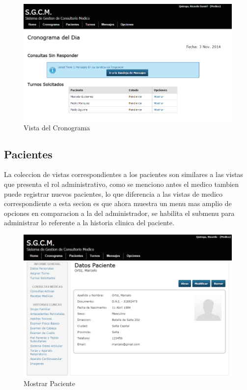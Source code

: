\begin{figure}[H]
    \centering
    \includegraphics[scale=0.5]{resourse/cronograma.png}
    \caption{Vista del Cronograma}
    \label{fig:614}
\end{figure}


\subsection{Pacientes}

La coleccion de vistas correspondientes a los pacientes son similares a las vistas
que presenta el rol administrativo, como se menciono antes el medico tambien puede
registrar nuevos pacientes, lo que diferencia a las vistas de medico correspondiente
a esta secion es que ahora muestra un menu mas amplio de opciones en comparacion 
a la del administrador, se habilita el submenu para administrar lo referente a la
historia clinica del paciente.

\begin{figure}[H]
    \centering
    \includegraphics[scale=0.5]{resourse/datos-paciente-m.png}
    \caption{Mostrar Paciente}
    \label{fig:615}
\end{figure}

